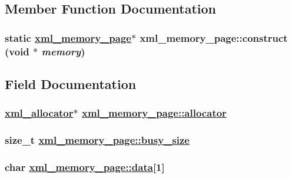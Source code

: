 \subsection{Member Function Documentation}
\hypertarget{structxml__memory__page_b425973f2abb4fa98ff077d88c0df11c}{
\subsubsection[construct]{\setlength{\rightskip}{0pt plus 5cm}static \hyperlink{structxml__memory__page}{xml\_\-memory\_\-page}$\ast$ xml\_\-memory\_\-page::construct (void $\ast$ {\em memory})}}
\label{structxml__memory__page_b425973f2abb4fa98ff077d88c0df11c}




\subsection{Field Documentation}
\hypertarget{structxml__memory__page_df8fa143123a842baa59b82fc3d83c3b}{
\subsubsection[allocator]{\setlength{\rightskip}{0pt plus 5cm}\hyperlink{structxml__allocator}{xml\_\-allocator}$\ast$ \hyperlink{structxml__memory__page_df8fa143123a842baa59b82fc3d83c3b}{xml\_\-memory\_\-page::allocator}}}
\label{structxml__memory__page_df8fa143123a842baa59b82fc3d83c3b}


\hypertarget{structxml__memory__page_04780ddabc14b45baba3d1ded79d355a}{
\subsubsection[busy\_\-size]{\setlength{\rightskip}{0pt plus 5cm}size\_\-t \hyperlink{structxml__memory__page_04780ddabc14b45baba3d1ded79d355a}{xml\_\-memory\_\-page::busy\_\-size}}}
\label{structxml__memory__page_04780ddabc14b45baba3d1ded79d355a}


\hypertarget{structxml__memory__page_bd99ed1563aa66fb3573a9208452685c}{
\subsubsection[data]{\setlength{\rightskip}{0pt plus 5cm}char \hyperlink{structxml__memory__page_bd99ed1563aa66fb3573a9208452685c}{xml\_\-memory\_\-page::data}\mbox{[}1\mbox{]}}}
\label{structxml__memory__page_bd99ed1563aa66fb3573a9208452685c}


